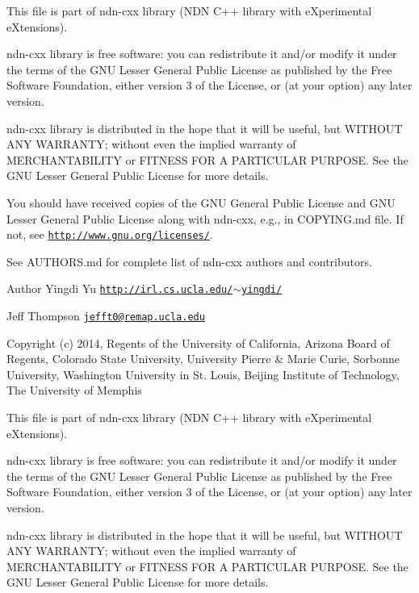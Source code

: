 This file is part of ndn-\/cxx library (N\+DN C++ library with e\+Xperimental e\+Xtensions).

ndn-\/cxx library is free software\+: you can redistribute it and/or modify it under the terms of the G\+NU Lesser General Public License as published by the Free Software Foundation, either version 3 of the License, or (at your option) any later version.

ndn-\/cxx library is distributed in the hope that it will be useful, but W\+I\+T\+H\+O\+UT A\+NY W\+A\+R\+R\+A\+N\+TY; without even the implied warranty of M\+E\+R\+C\+H\+A\+N\+T\+A\+B\+I\+L\+I\+TY or F\+I\+T\+N\+E\+SS F\+OR A P\+A\+R\+T\+I\+C\+U\+L\+AR P\+U\+R\+P\+O\+SE. See the G\+NU Lesser General Public License for more details.

You should have received copies of the G\+NU General Public License and G\+NU Lesser General Public License along with ndn-\/cxx, e.\+g., in C\+O\+P\+Y\+I\+N\+G.\+md file. If not, see \href{http://www.gnu.org/licenses/}{\tt http\+://www.\+gnu.\+org/licenses/}.

See A\+U\+T\+H\+O\+R\+S.\+md for complete list of ndn-\/cxx authors and contributors.

\begin{DoxyAuthor}{Author}
Yingdi Yu \href{http://irl.cs.ucla.edu/~yingdi/}{\tt http\+://irl.\+cs.\+ucla.\+edu/$\sim$yingdi/} 

Jeff Thompson \href{mailto:jefft0@remap.ucla.edu}{\tt jefft0@remap.\+ucla.\+edu}
\end{DoxyAuthor}
Copyright (c) 2014, Regents of the University of California, Arizona Board of Regents, Colorado State University, University Pierre \& Marie Curie, Sorbonne University, Washington University in St. Louis, Beijing Institute of Technology, The University of Memphis

This file is part of ndn-\/cxx library (N\+DN C++ library with e\+Xperimental e\+Xtensions).

ndn-\/cxx library is free software\+: you can redistribute it and/or modify it under the terms of the G\+NU Lesser General Public License as published by the Free Software Foundation, either version 3 of the License, or (at your option) any later version.

ndn-\/cxx library is distributed in the hope that it will be useful, but W\+I\+T\+H\+O\+UT A\+NY W\+A\+R\+R\+A\+N\+TY; without even the implied warranty of M\+E\+R\+C\+H\+A\+N\+T\+A\+B\+I\+L\+I\+TY or F\+I\+T\+N\+E\+SS F\+OR A P\+A\+R\+T\+I\+C\+U\+L\+AR P\+U\+R\+P\+O\+SE. See the G\+NU Lesser General Public License for more details.

